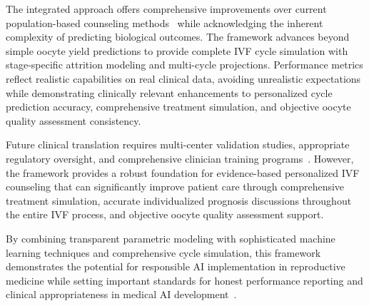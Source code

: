 The integrated approach offers comprehensive improvements over current population-based counseling methods~\cite{paternot2009observer,paternot2011multicentre} while acknowledging the inherent complexity of predicting biological outcomes. The framework advances beyond simple oocyte yield predictions to provide complete IVF cycle simulation with stage-specific attrition modeling and multi-cycle projections. Performance metrics reflect realistic capabilities on real clinical data, avoiding unrealistic expectations while demonstrating clinically relevant enhancements to personalized cycle prediction accuracy, comprehensive treatment simulation, and objective oocyte quality assessment consistency.

Future clinical translation requires multi-center validation studies, appropriate regulatory oversight, and comprehensive clinician training programs~\cite{fda2021ai,fda2022clinical,varoquaux2022machine}. However, the framework provides a robust foundation for evidence-based personalized IVF counseling that can significantly improve patient care through comprehensive treatment simulation, accurate individualized prognosis discussions throughout the entire IVF process, and objective oocyte quality assessment support.

By combining transparent parametric modeling with sophisticated machine learning techniques and comprehensive cycle simulation, this framework demonstrates the potential for responsible AI implementation in reproductive medicine while setting important standards for honest performance reporting and clinical appropriateness in medical AI development~\cite{topol2019high,litjens2017survey}. 